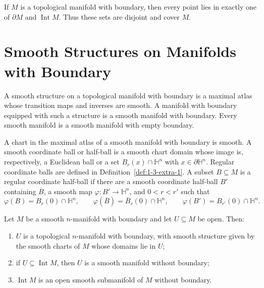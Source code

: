 \begin{theorem}
\label{thm:1-37}
\mathlibok
{}
If $M$ is a topological manifold with boundary, then every point lies in
exactly one of $\partial M$ and $\operatorname{Int}M$. Thus these sets are
disjoint and cover $M$.
\end{theorem}


\section{Smooth Structures on Manifolds with Boundary}

\begin{definition}
\label{def:1-6-extra-2}
\leanok
A smooth structure on a topological manifold with boundary is a maximal atlas
whose transition maps and inverses are smooth. A manifold with boundary
equipped with such a structure is a smooth manifold with boundary. Every
smooth manifold is a smooth manifold with empty boundary.
\end{definition}

\begin{definition}
\label{def:1-6-extra-3}
\leanok
A chart in the maximal atlas of a smooth manifold with boundary is smooth.
A smooth coordinate ball or half-ball is a smooth chart domain whose image is,
respectively, a Euclidean ball or a set $B_r(x)\cap\mathbb H^n$ with
$x\in\partial\mathbb H^n$. Regular coordinate balls are defined in
Definition~\ref{def:1-3-extra-1}. A subset $B\subseteq M$ is a regular
coordinate half-ball if there are a smooth coordinate half-ball $B'$
containing $\overline B$, a smooth map $\varphi:B'\to\mathbb H^n$, and
$0<r<r'$ such that
\[
\varphi(B)=B_r(0)\cap\mathbb H^n,\qquad
\varphi(\overline B)=\overline B_r(0)\cap\mathbb H^n,\qquad
\varphi(B')=B_{r'}(0)\cap\mathbb H^n.
\]
\end{definition}

\begin{proposition}
\label{exer:1-44}
\leanok
{}
Let $M$ be a smooth $n$-manifold with boundary and let $U\subseteq M$ be open.
Then:
\begin{enumerate}
\item $U$ is a topological $n$-manifold with boundary, with smooth structure
given by the smooth charts of $M$ whose domains lie in $U$;
\item if $U\subseteq\operatorname{Int}M$, then $U$ is a smooth manifold
without boundary;
\item $\operatorname{Int}M$ is an open smooth submanifold of $M$ without
boundary.
\end{enumerate}
\end{proposition}


